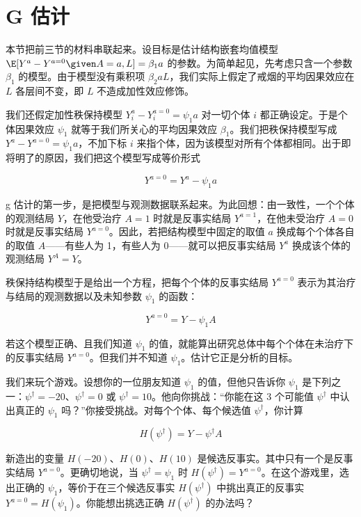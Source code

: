 
\section{G 估计}

本节把前三节的材料串联起来。设目标是估计结构嵌套均值模型 $\E[Y^a-Y^{a=0}\given A=a,L]=\beta_1a$ 的参数。为简单起见，先考虑只含一个参数 $\beta_1$ 的模型。由于模型没有乘积项 $\beta_2aL$，我们实际上假定了戒烟的平均因果效应在 $L$ 各层间不变，即 $L$ 不造成加性效应修饰。

我们还假定加性秩保持模型 $Y_i^a-Y_i^{a=0}=\psi_1a$ 对一切个体 $i$ 都正确设定。于是个体因果效应 $\psi_1$ 就等于我们所关心的平均因果效应 $\beta_1$。我们把秩保持模型写成 $Y^a-Y^{a=0}=\psi_1a$，不加下标 $i$ 来指个体，因为该模型对所有个体都相同。出于即将明了的原因，我们把这个模型写成等价形式

\[
Y^{a=0}=Y^a-\psi_1a
\]

g 估计的第一步，是把模型与观测数据联系起来。为此回想：由一致性，一个个体的观测结局 $Y$，在他受治疗 $A=1$ 时就是反事实结局 $Y^{a=1}$，在他未受治疗 $A=0$ 时就是反事实结局 $Y^{a=0}$。因此，若把结构模型中固定的取值 $a$ 换成每个个体各自的取值 $A$——有些人为 1，有些人为 0——就可以把反事实结局 $Y^a$ 换成该个体的观测结局 $Y^A=Y$。

秩保持结构模型于是给出一个方程，把每个个体的反事实结局 $Y^{a=0}$ 表示为其治疗与结局的观测数据以及未知参数 $\psi_1$ 的函数：

\[
Y^{a=0}=Y-\psi_1A
\]

若这个模型正确、且我们知道 $\psi_1$ 的值，就能算出研究总体中每个个体在未治疗下的反事实结局 $Y^{a=0}$。但我们并不知道 $\psi_1$。估计它正是分析的目标。

我们来玩个游戏。设想你的一位朋友知道 $\psi_1$ 的值，但他只告诉你 $\psi_1$ 是下列之一：$\psi^\dagger=-20$、$\psi^\dagger=0$ 或 $\psi^\dagger=10$。他向你挑战：“你能在这 3 个可能值 $\psi^\dagger$ 中认出真正的 $\psi_1$ 吗？”你接受挑战。对每个个体、每个候选值 $\psi^\dagger$，你计算

\[
H(\psi^\dagger)=Y-\psi^\dagger A
\]

新造出的变量 $H(-20)$、$H(0)$、$H(10)$ 是候选反事实。其中只有一个是反事实结局 $Y^{a=0}$。更确切地说，当 $\psi^\dagger=\psi_1$ 时 $H(\psi^\dagger)=Y^{a=0}$。在这个游戏里，选出正确的 $\psi_1$，等价于在三个候选反事实 $H(\psi^\dagger)$ 中挑出真正的反事实 $Y^{a=0}=H(\psi_1)$。你能想出挑选正确 $H(\psi^\dagger)$ 的办法吗？

